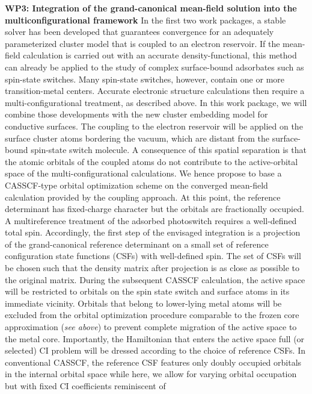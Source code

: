 \documentclass[a4paper,11pt,headings=normal]{scrartcl}
\begin{document}
\noindent
\textbf{WP3: Integration of the grand-canonical mean-field solution into the multiconfigurational framework} 
In the first two work packages, a stable solver has been developed that 
guarantees convergence for an adequately parameterized cluster model that is 
coupled to an electron reservoir. If the mean-field calculation is carried out 
with an accurate density-functional, this method can already be applied to the 
study of complex surface-bound adsorbates such as spin-state switches. 
Many spin-state switches, however, 
contain one or more transition-metal centers. Accurate electronic 
structure calculations then require a multi-configurational treatment, as 
described above. In this work package, we will combine those developments with the 
new 
cluster embedding model for conductive surfaces. The coupling to the electron 
reservoir will be applied on the surface cluster atoms bordering the vacuum, 
which are distant from the surface-bound spin-state switch molecule. A 
consequence of this spatial separation is that the atomic orbitals of the 
coupled atoms do not contribute to the active-orbital space of the 
multi-configurational calculations. We hence propose to base a CASSCF-type 
orbital optimization scheme on the converged mean-field calculation provided by 
the coupling approach. At this point, the reference determinant has 
fixed-charge character but the orbitals are fractionally occupied.\\
A multireference treatment of the adsorbed photoswitch requires a well-defined 
total spin. Accordingly, the first step of the envisaged integration is a 
projection of the grand-canonical reference determinant on a small set of 
reference configuration state functions (CSFs) with well-defined spin. The set 
of CSFs will be chosen such that the density matrix after projection is as 
close as possible to the original matrix. During the subsequent CASSCF 
calculation, the active space will be restricted to orbitals on the spin state 
switch and surface atoms in its immediate vicinity. Orbitals 
that belong to lower-lying metal atoms will be excluded from the orbital 
optimization procedure comparable to the frozen core approximation 
(\textit{see above}) to prevent complete migration of the active space to the 
metal core. Importantly, the Hamiltonian that enters the active space full (or 
selected) CI problem will be dressed according to the choice of 
reference CSFs. In conventional CASSCF, the reference CSF features only doubly 
occupied orbitals in the internal orbital space while here, we allow for 
varying orbital occupation but with fixed CI coefficients reminiscent of 
\end{document}
